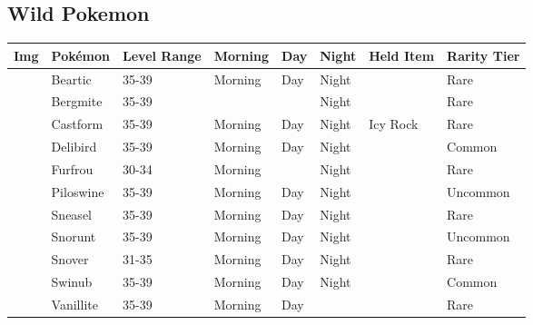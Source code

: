 \subsection{Wild Pokemon}%
\label{subsec:WildPokemon}%
\begin{longtable}{||l l l l l l l l||}%
\hline%
Img&Pokémon&Level Range&Morning&Day&Night&Held Item&Rarity Tier\\%
\hline%
\endhead%
\hline%
&Beartic&35{-}39&Morning&Day&Night&&Rare\\%
\hline%
&Bergmite&35{-}39&&&Night&&Rare\\%
\hline%
&Castform&35{-}39&Morning&Day&Night&Icy Rock&Rare\\%
\hline%
&Delibird&35{-}39&Morning&Day&Night&&Common\\%
\hline%
&Furfrou&30{-}34&Morning&&Night&&Rare\\%
\hline%
&Piloswine&35{-}39&Morning&Day&Night&&Uncommon\\%
\hline%
&Sneasel&35{-}39&Morning&Day&Night&&Rare\\%
\hline%
&Snorunt&35{-}39&Morning&Day&Night&&Uncommon\\%
\hline%
&Snover&31{-}35&Morning&Day&Night&&Rare\\%
\hline%
&Swinub&35{-}39&Morning&Day&Night&&Common\\%
\hline%
&Vanillite&35{-}39&Morning&Day&&&Rare\\%
\hline%
\end{longtable}